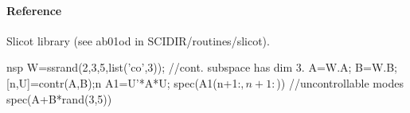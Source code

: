 \paragraph{Reference}
Slicot library (see ab01od in SCIDIR/routines/slicot).
\begin{examples}
  \begin{mintednsp}{nsp}
    W=ssrand(2,3,5,list('co',3));  //cont. subspace has dim 3.
    A=W.A; B=W.B;
    [n,U]=contr(A,B);n
    A1=U'*A*U;
    spec(A1(n+1:$,n+1:$))  //uncontrollable modes
    spec(A+B*rand(3,5))    
  \end{mintednsp}
\end{examples}
\begin{manseealso}
        
\end{manseealso}

